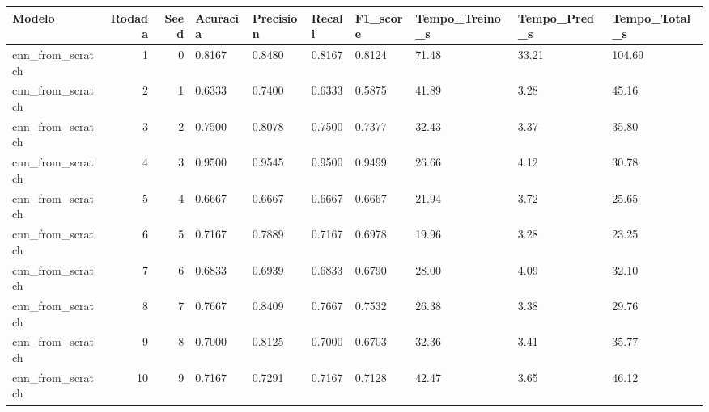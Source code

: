 \begin{tabular}{lrrlllllll}
\toprule
Modelo & Rodada & Seed & Acuracia & Precision & Recall & F1_score & Tempo_Treino_s & Tempo_Pred_s & Tempo_Total_s \\
\midrule
cnn_from_scratch & 1 & 0 & 0.8167 & 0.8480 & 0.8167 & 0.8124 & 71.48 & 33.21 & 104.69 \\
cnn_from_scratch & 2 & 1 & 0.6333 & 0.7400 & 0.6333 & 0.5875 & 41.89 & 3.28 & 45.16 \\
cnn_from_scratch & 3 & 2 & 0.7500 & 0.8078 & 0.7500 & 0.7377 & 32.43 & 3.37 & 35.80 \\
cnn_from_scratch & 4 & 3 & 0.9500 & 0.9545 & 0.9500 & 0.9499 & 26.66 & 4.12 & 30.78 \\
cnn_from_scratch & 5 & 4 & 0.6667 & 0.6667 & 0.6667 & 0.6667 & 21.94 & 3.72 & 25.65 \\
cnn_from_scratch & 6 & 5 & 0.7167 & 0.7889 & 0.7167 & 0.6978 & 19.96 & 3.28 & 23.25 \\
cnn_from_scratch & 7 & 6 & 0.6833 & 0.6939 & 0.6833 & 0.6790 & 28.00 & 4.09 & 32.10 \\
cnn_from_scratch & 8 & 7 & 0.7667 & 0.8409 & 0.7667 & 0.7532 & 26.38 & 3.38 & 29.76 \\
cnn_from_scratch & 9 & 8 & 0.7000 & 0.8125 & 0.7000 & 0.6703 & 32.36 & 3.41 & 35.77 \\
cnn_from_scratch & 10 & 9 & 0.7167 & 0.7291 & 0.7167 & 0.7128 & 42.47 & 3.65 & 46.12 \\
\bottomrule
\end{tabular}

